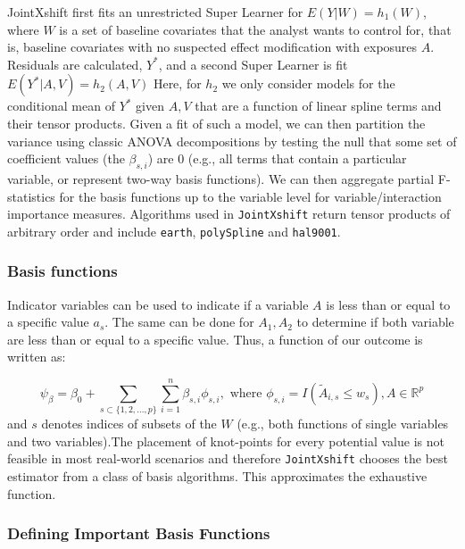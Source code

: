 \documentclass[
]{article}
\begin{document}
JointXshift first fits an unrestricted Super Learner for
\(E(Y|W) = h_1(W)\), where \(W\) is a set of baseline covariates that
the analyst wants to control for, that is, baseline covariates with no
suspected effect modification with exposures \(A\). Residuals are
calculated, \(Y^*\), and a second Super Learner is fit
\(E(Y^*|A,V) = h_2(A,V)\) Here, for \(h_2\) we only consider models for
the conditional mean of \(Y^*\) given \(A,V\) that are a function of
linear spline terms and their tensor products. Given a fit of such a
model, we can then partition the variance using classic ANOVA
decompositions by testing the null that some set of coefficient values
(the \(\beta_{s,i}\)) are 0 (e.g., all terms that contain a particular
variable, or represent two-way basis functions). We can then aggregate
partial F-statistics for the basis functions up to the variable level
for variable/interaction importance measures. Algorithms used in
\texttt{JointXshift} return tensor products of arbitrary order and include
\texttt{earth}, \texttt{polySpline} and \texttt{hal9001}.

\hypertarget{basis-functions}{%
\subsubsection{Basis functions}\label{basis-functions}}

Indicator variables can be used to indicate if a variable \(A\) is less
than or equal to a specific value \(a_s\). The same can be done for
\(A_1, A_2\) to determine if both variable are less than or equal to a
specific value. Thus, a function of our outcome is written as:

\[\psi_{\beta} = \beta_0 + \sum_{s\subset \{1,2,...,p\}}\sum_{i=1}^{n} \beta_{s,i} \phi_{s,i},
    \text{ where } \phi_{s,i} = I(\tilde{A}_{i,s} \leq w_s), A \in \mathbb{R}^p\]
and \(s\) denotes indices of subsets of the \(W\) (e.g., both functions
of single variables and two variables).The placement of knot-points for
every potential value is not feasible in most real-world scenarios and
therefore \texttt{JointXshift} chooses the best estimator from a class of
basis algorithms. This approximates the exhaustive function.

\hypertarget{defining-important-basis-functions}{%
\subsubsection{Defining Important Basis
Functions}\label{defining-important-basis-functions}}
\end{document}
